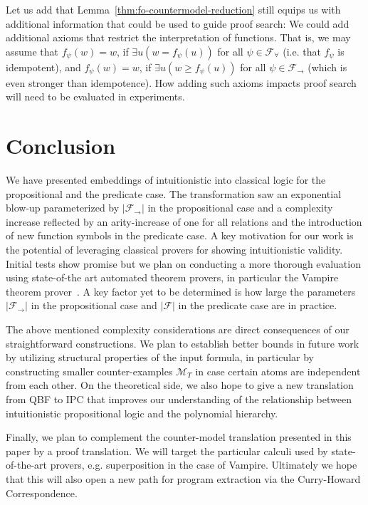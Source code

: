 \documentclass[a4paper,UKenglish,cleveref, autoref, thm-restate]{lipics-v2021}
\begin{document}
Let us add that Lemma~\ref{thm:fo-countermodel-reduction} still equips us with additional information that could be used to guide proof search: We could add additional axioms that restrict the interpretation of functions. That is, we may assume that $f_\psi(w) = w$, if $\exists u(w = f_\psi(u))$ for all $\psi\in\mathcal F_\forall$ (i.e. that $f_\psi$ is idempotent), and $f_\psi(w) = w$, if $\exists u(w \geq f_\psi(u))$ for all $\psi\in\mathcal F_\to$ (which is even stronger than idempotence).
How adding such axioms impacts proof search will need to be evaluated in experiments.

\section{Conclusion}

We have presented embeddings of intuitionistic into classical logic for the propositional and the predicate case.
The transformation saw an exponential blow-up parameterized by $|\mathcal F_\to|$ in the propositional case and a complexity increase reflected by an arity-increase of one for all relations and the introduction of new function symbols in the predicate case.
A key motivation for our work is the potential of leveraging classical provers for showing intuitionistic validity.
Initial tests show promise but we plan on conducting a more thorough evaluation using state-of-the art automated theorem provers, in particular the Vampire theorem prover~\cite{kovacs2013first}.
A key factor yet to be determined is how large the parameters $|\mathcal F_\to|$ in the propositional case and $|\mathcal F|$ in the predicate case are in practice.

The above mentioned complexity considerations are direct consequences of our straightforward constructions.
We plan to establish better bounds in future work by utilizing structural properties of the input formula, in particular by constructing smaller counter-examples $\mathcal M_T$ in case certain atoms are independent from each other.
On the theoretical side, we also hope to give a new translation from QBF to IPC that improves our understanding of the relationship between intuitionistic propositional logic and the polynomial hierarchy.

Finally, we plan to complement the counter-model translation presented in this paper by a proof translation.
We will target the particular calculi used by state-of-the-art provers, e.g. superposition in the case of Vampire. Ultimately we hope that this will also open a new path for program extraction via the Curry-Howard Correspondence.
\end{document}
